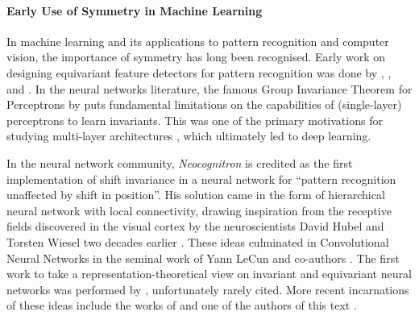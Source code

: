 \paragraph{Early Use of Symmetry in Machine Learning}
In machine learning and its applications to pattern recognition and computer vision, the importance of symmetry has long been recognised. 
%
Early work on designing equivariant feature detectors for pattern recognition was done by \citet{amari1978feature}, \citet{kanatani2012group}, and \citet{lenz1990group}. 
%
In the 
neural networks literature, the famous Group Invariance Theorem for Perceptrons
by \citet{minsky2017perceptrons} puts fundamental limitations on the capabilities
of (single-layer) perceptrons to learn invariants. This was one of the primary motivations for studying multi-layer architectures \citep{sejnowski1986learning,shawe1989building,shawe1993symmetries}, which ultimately led to deep learning. 

In the neural network community, {\em Neocognitron} \citep{fukushima1982neocognitron} is credited as the first  implementation of shift invariance in a neural network for ``pattern recognition unaffected by shift in position''. 
%
His solution came in the form of hierarchical neural network with local connectivity, drawing inspiration from the receptive fields discovered in the visual cortex by the neuroscientists David Hubel and Torsten Wiesel two decades earlier \citep{hubel1959receptive}. 
%
These ideas culminated in Convolutional Neural Networks in the seminal work of Yann LeCun and co-authors \citep{lecun1998gradient}. 
%
The first work to take a representation-theoretical view on invariant and equivariant neural networks was performed by \citet{wood1996representation}, unfortunately rarely cited. 
%
More recent incarnations of these ideas include the works of \citet{makadia2007correspondence,esteves2020spin}
and one of the authors of this text \citep{cohen2016group}.










